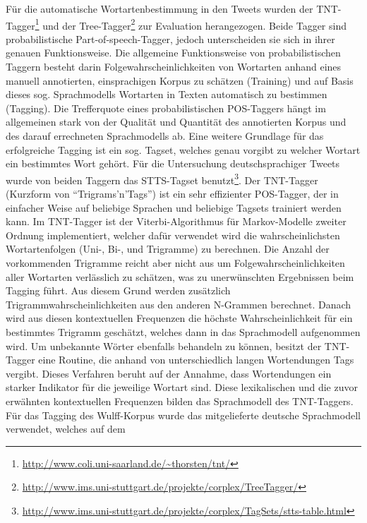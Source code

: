 \documentclass[11pt]{article}
\begin{document}
Für die automatische Wortartenbestimmung in den Tweets wurden der
TNT-Tagger\footnote{\url{http://www.coli.uni-saarland.de/~thorsten/tnt/}} und
der
Tree-Tagger\footnote{\url{http://www.ims.uni-stuttgart.de/projekte/corplex/TreeTagger/}}
zur Evaluation herangezogen. Beide Tagger sind probabilistische
Part-of-speech-Tagger, jedoch unterscheiden sie sich in ihrer
genauen Funktionsweise. \newline 
Die allgemeine Funktionsweise von probabilistischen Taggern besteht darin
Folgewahrscheinlichkeiten von Wortarten anhand eines manuell annotierten, 
einsprachigen Korpus zu schätzen (Training) und auf Basis
dieses sog. Sprachmodells Wortarten in Texten automatisch zu bestimmen
(Tagging). Die Trefferquote eines probabilistischen POS-Taggers hängt
im allgemeinen stark von der Qualität und Quantität des annotierten
Korpus und des darauf errechneten Sprachmodells ab. Eine weitere Grundlage für
das erfolgreiche Tagging ist ein sog. Tagset, welches genau vorgibt zu welcher Wortart ein bestimmtes Wort gehört. 
Für die Untersuchung deutschsprachiger Tweets wurde von beiden Taggern das STTS-Tagset 
benutzt\footnote{\url{http://www.ims.uni-stuttgart.de/projekte/corplex/TagSets/stts-table.html}}.
\newline
Der TNT-Tagger (Kurzform von ``Trigrams'n'Tags'') ist ein sehr effizienter POS-Tagger, 
der in einfacher Weise auf beliebige Sprachen und beliebige Tagsets
trainiert werden kann. Im TNT-Tagger ist der Viterbi-Algorithmus für Markov-Modelle zweiter Ordnung
implementiert, welcher dafür verwendet wird
die wahrscheinlichsten Wortartenfolgen (Uni-, Bi-, und Trigramme)
zu berechnen. Die Anzahl der vorkommenden Trigramme reicht aber nicht aus um
Folgewahrscheinlichkeiten aller Wortarten verlässlich zu schätzen, was zu
unerwünschten Ergebnissen beim Tagging führt. Aus diesem Grund werden zusätzlich
Trigrammwahrscheinlichkeiten aus den anderen N-Grammen berechnet. Danach wird
aus diesen kontextuellen Frequenzen die höchste Wahrscheinlichkeit für ein
bestimmtes Trigramm geschätzt, welches dann in das Sprachmodell aufgenommen
wird. Um unbekannte Wörter ebenfalls behandeln zu können,
besitzt der TNT-Tagger eine Routine, die anhand von unterschiedlich langen Wortendungen Tags vergibt. 
Dieses Verfahren beruht auf der Annahme, dass Wortendungen ein starker Indikator
für die jeweilige Wortart sind. Diese lexikalischen und die zuvor erwähnten
kontextuellen Frequenzen bilden das Sprachmodell des TNT-Taggers. Für das
Tagging des  Wulff-Korpus wurde das mitgelieferte deutsche Sprachmodell
verwendet, welches auf dem
\end{document}
